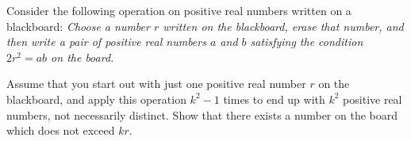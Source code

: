 Consider the following operation on positive real numbers written on a blackboard: \emph{Choose a number $ r$ written on the blackboard, erase that number, and then write a pair of positive real numbers $ a$ and $ b$ satisfying the condition $ 2 r^2 = ab$ on the board. }

Assume that you start out with just one positive real number $ r$ on the blackboard, and apply this operation $ k^2 - 1$ times to end up with $ k^2$ positive real numbers, not necessarily distinct. Show that there exists a number on the board which does not exceed $kr$.